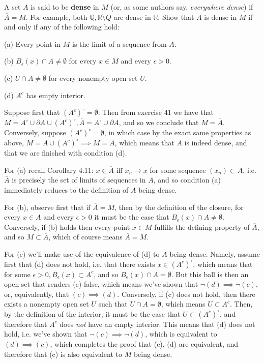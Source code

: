 \begin{exercise}{46}
    A set $A$ is said to be \textbf{dense} in $M$ (or, as some authors say, \textit{everywhere dense}) if $\overline{A} = M$.
    For example, both $\mathbb{Q}, \mathbb{R} \setminus Q$ are dense in $\mathbb{R}$.
    Show that $A$ is dense in $M$ if and only if any of the following hold:

    (a) Every point in $M$ is the limit of a sequence from $A$.

    (b) $B_{\epsilon}(x) \cap A \neq \emptyset$ for every $x \in M$ and every $\epsilon > 0$.

    (c) $U \cap A \neq \emptyset$ for every nonempty open set $U$.

    (d) $A^c$ has empty interior.
\end{exercise}

\begin{solution}
    
    Suppose first that $(A^c)^\circ = \emptyset$.
    Then from exercise 41 we have that $M = A^\circ \cup \partial A \cup (A^c)^\circ, \overline{A} = A^\circ \cup \partial A$, and so we conclude that $M = \overline{A}$.
    Conversely, suppose $(A^c)^\circ = \emptyset$, in which case by the exact same properties as above, $M = \overline{A} \cup (A^c)^\circ \implies M = \overline{A}$, which means that $A$ is indeed dense, and that we are finished with condition (d).

    For (a) recall Corollary 4.11: $x \in \overline{A}$ iff $x_n \rightarrow x$ for some sequence $(x_n) \subset A$, i.e. $\overline{A}$ is precisely the set of limits of sequences in $A$, and so condition (a) immediately reduces to the definition of $A$ being dense.
    
    For (b), observe first that if $\overline{A} = M$, then by the definition of the closure, for every $x \in A$ and every $\epsilon > 0$ it must be the case that $B_{\epsilon}(x) \cap A \neq \emptyset$.
    Conversely, if (b) holds then every point $x \in M$ fulfills the defining property of $\overline{A}$, and so $M \subset \overline{A}$, which of course means $\overline{A} = M$.

    For (c) we'll make use of the equivalence of (d) to $A$ being dense.
    Namely, assume first that (d) does not hold, i.e. that there exists $x \in (A^c)^\circ$, which means that for some $\epsilon > 0, B_{\epsilon}(x) \subset A^c$, and so $B_{\epsilon}(x) \cap A = \emptyset$.
    But this ball is then an open set that renders (c) false, which means we've shown that $\neg (d) \implies \neg (c)$, or, equivalently, that $(c) \implies (d)$.
    Conversely, if (c) does not hold, then there exists a nonempty open set $U$ such that $U \cap A = \emptyset$, which means $U \subset A^c$.
    Then, by the definition of the interior, it must be the case that $U \subset (A^c)^\circ$, and therefore that $A^c$ does \textit{not} have an empty interior.
    This means that (d) does not hold, i.e. we've shown that $ \neg (c) \implies \neg (d)$, which is equivalent to $(d) \implies (c)$, which completes the proof that (c), (d) are equivalent, and therefore that (c) is also equivalent to $M$ being dense.
\end{solution}